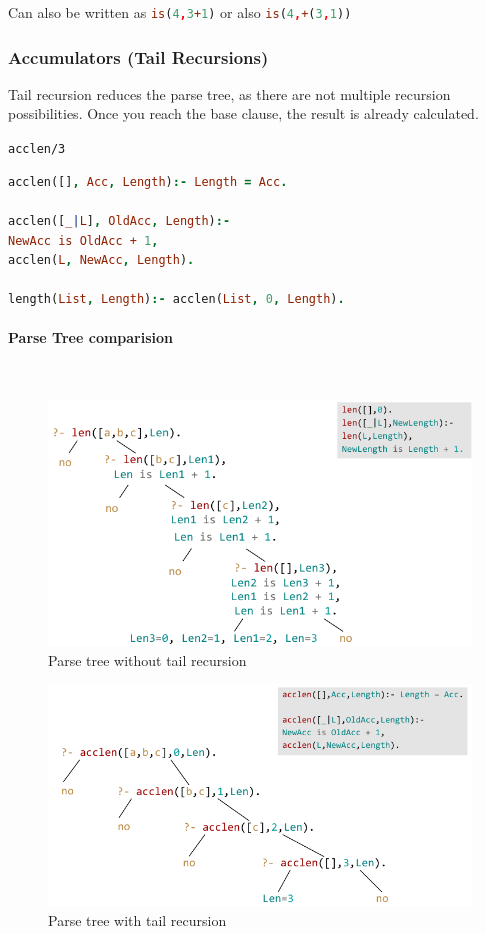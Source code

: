 Can also be written as \lstinline[language=Prolog]|is(4,3+1)| or also \lstinline[language=Prolog]|is(4,+(3,1))|

\subsubsection{Accumulators (Tail Recursions)}

Tail recursion reduces the parse tree, as there are not multiple recursion possibilities. Once you reach the base clause, the result is already calculated.

\lstinline|acclen/3|

\begin{lstlisting}[language=Prolog]
acclen([], Acc, Length):- Length = Acc.

acclen([_|L], OldAcc, Length):-
NewAcc is OldAcc + 1,
acclen(L, NewAcc, Length).

length(List, Length):- acclen(List, 0, Length).
\end{lstlisting}

\paragraph{Parse Tree comparision} \hfill \\

\begin{figure}[h]
	\centering
	\includegraphics[width=0.5\linewidth]{images/parse_tree_acclen_2}
	\caption{Parse tree without tail recursion}
	\label{fig:parsetreeacclen2}
\end{figure}

\begin{figure}[h]
\centering
\includegraphics[width=0.5\linewidth]{images/parse_tree_acclen_tail_recursion}
\caption{Parse tree with tail recursion}
\label{fig:parsetreeacclentailrecursion}
\end{figure}

